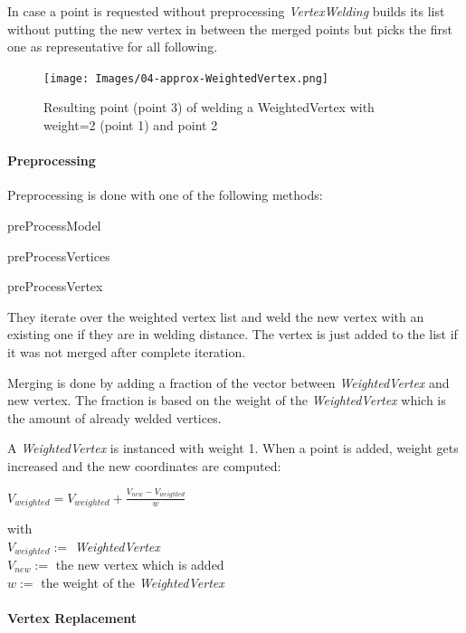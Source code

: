 \documentclass[../ClassicThesis.tex]{subfiles}
\begin{document}
In case a point is requested without preprocessing \emph{VertexWelding} builds its list without putting the new vertex in between the merged points but picks the first one as representative for all following.

\begin{figure}
\texttt{[image: Images/04-approx-WeightedVertex.png]}
\caption{Resulting point (point 3) of welding a WeightedVertex with weight=2 (point 1) and point 2}
\label{fig:weightedVertex}
\end{figure}


\paragraph{Preprocessing}

Preprocessing is done with one of the following methods:

\begin{description}
    \item preProcessModel
    \item preProcessVertices
    \item preProcessVertex
\end{description}

They iterate over the weighted vertex list and weld the new vertex with an existing one if they are in welding distance. The vertex is just added to the list if it was not merged after complete iteration.

Merging is done by adding a fraction of the vector between \emph{WeightedVertex} and new vertex. The fraction is based on the weight of the \emph{WeightedVertex} which is the amount of already welded vertices.

A \emph{WeightedVertex} is instanced with weight 1. When a point is added, weight gets increased and the new coordinates are computed:

$ V_{weighted} = V_{weighted} + \frac{V_{new} - V_{weighted}}{w}$

with \\
$ V_{weighted} := $ \emph{WeightedVertex} \\
$ V_{new} := $ the new vertex which is added \\
$ w := $ the weight of the \emph{WeightedVertex}



\paragraph{Vertex Replacement}
\end{document}
